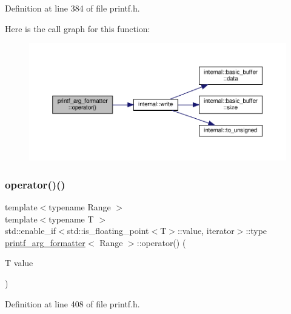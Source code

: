 Definition at line 384 of file printf.\+h.

Here is the call graph for this function\+:
\nopagebreak
\begin{figure}[H]
\begin{center}
\leavevmode
\includegraphics[width=350pt]{classprintf__arg__formatter_adf72c691ec2561e444ac9520cc158243_cgraph}
\end{center}
\end{figure}
\mbox{\label{classprintf__arg__formatter_a5f44717eed332acb0f2a50cfaa6b2efd}} 
\subsubsection{\texorpdfstring{operator()()}{operator()()}\hspace{0.1cm}{\footnotesize\ttfamily [2/8]}}
{\footnotesize\ttfamily template$<$typename Range $>$ \\
template$<$typename T $>$ \\
std\+::enable\+\_\+if$<$std\+::is\+\_\+floating\+\_\+point$<$T$>$\+::value, iterator$>$\+::type \hyperlink{classprintf__arg__formatter}{printf\+\_\+arg\+\_\+formatter}$<$ Range $>$\+::operator() (\begin{DoxyParamCaption}\item[{T}]{value }\end{DoxyParamCaption})\hspace{0.3cm}{\ttfamily [inline]}}



Definition at line 408 of file printf.\+h.

\mbox{\label{classprintf__arg__formatter_a4e462c5b70ceef75a41261472aa56313}} 
